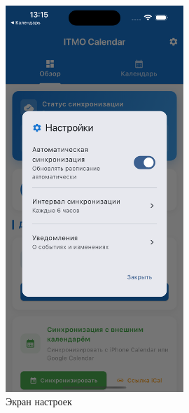 \begin{figure}[h!]
    \centering
    \includegraphics[width=0.6\textwidth]{images/settings.png}
    \caption{Экран настроек}
    \label{fig:settings}
\end{figure}


